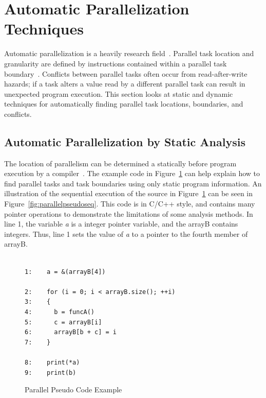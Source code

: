 \documentclass[defaultstyle,11pt]{thesis}
\begin{document}
\section{Automatic Parallelization Techniques}

Automatic parallelization is a heavily research
field~\cite{hoeflinger:98:uiuccs, blume:1992:pds, Hall:2005wd}.
Parallel task location and granularity are defined by instructions
contained within a parallel task boundary~\cite{chen:1990:isca}.
Conflicts between parallel tasks often occur from read-after-write
hazards; if a task alters a value read by a different parallel task
can result in unexpected program execution.  This section looks at
static and dynamic techniques for automatically finding parallel task
locations, boundaries, and conflicts.

\subsection{Automatic Parallelization by Static Analysis}

The location of parallelism can be determined a statically before
program execution by a
compiler~\cite{bringmann:95:uiuccs,dou:2007:trans}.  The example code
in Figure~\ref{fig:parallelpseudosrc} can help explain how to find
parallel tasks and task boundaries using only static program
information.  An illustration of the sequential execution of the
source in Figure~\ref{fig:parallelpseudosrc} can be seen in
Figure~\ref{fig:parallelpseudoseq}.  This code is in C/C++ style, and
contains many pointer operations to demonstrate the limitations of some
analysis methods.  In line 1, the variable \textit{a} is a integer
pointer variable, and the arrayB contains integers.  Thus, line 1 sets
the value of \textit{a} to a pointer to the fourth member of arrayB.

\begin{figure}
  \begin{lstlisting}
    
1:    a = &(arrayB[4])

2:    for (i = 0; i < arrayB.size(); ++i)
3:    {
4:      b = funcA()
5:      c = arrayB[i]
6:      arrayB[b + c] = i
7:    }
    
8:    print(*a)
9:    print(b)

  \end{lstlisting}
  \caption{Parallel Pseudo Code Example}
  \label{fig:parallelpseudosrc}
\end{figure}
\end{document}
